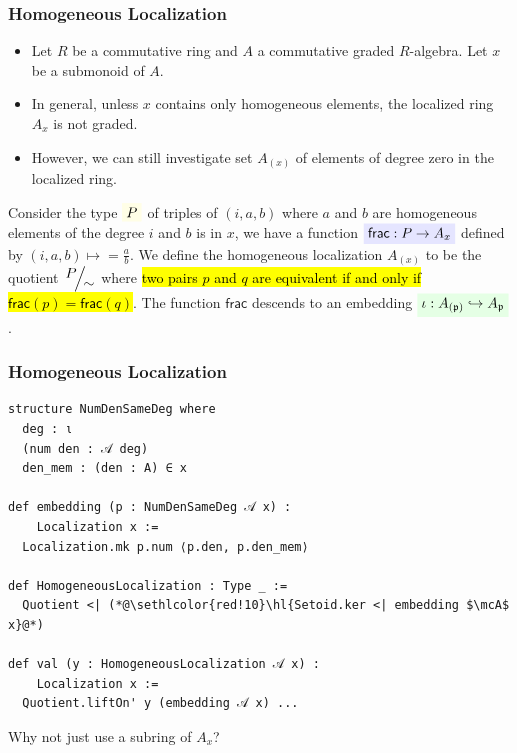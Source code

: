 \documentclass[9pt]{beamer}
\begin{document}
\begin{frame}[fragile]
  \frametitle{Homogeneous Localization}
\begin{itemize}

  \item Let $R$ be a commutative ring and $A$ a commutative graded $R$-algebra. Let $x$ be a submonoid of $A$. 
  \item In general, unless $x$ contains only homogeneous elements, the localized ring $A_x$ is not graded.
  \item However, we can still investigate set $A_{(x)}$ of elements of degree zero in the localized ring. 
\end{itemize}

Consider the type $\mathcolorbox{yellow!10}{P}$ of triples of $(i, a, b)$ where $a$ and $b$ are 
  homogeneous elements of the degree $i$ and $b$ is in $x$, we have a function $\mathcolorbox{blue!10}{\mathsf{frac} : P \to A_{x}}$ defined by
  $(i, a, b) \mapsto =\frac a b$.
  We define the homogeneous localization $A_{(x)}$ to be the quotient $\quotient{P}{\sim}$ where \hl{two pairs $p$ and $q$
  are equivalent if and only if $\mathsf{frac}(p) = \mathsf{frac}(q)$}. 
  The function $\mathsf{frac}$ descends to an embedding $\mathcolorbox{green!10}{\iota: \hloca A{\mfp} \hookrightarrow A_{\mfp}}$.
\end{frame}

\begin{frame}[fragile]
  \frametitle{Homogeneous Localization}
\begin{lstlisting}[linebackgroundcolor={%
  \ifnum\value{lstnumber}=1\color{yellow!10}\fi
  \ifnum\value{lstnumber}=2\color{yellow!10}\fi
  \ifnum\value{lstnumber}=3\color{yellow!10}\fi
  \ifnum\value{lstnumber}=4\color{yellow!10}\fi
  \ifnum\value{lstnumber}=6\color{blue!10}\fi
  \ifnum\value{lstnumber}=7\color{blue!10}\fi
  \ifnum\value{lstnumber}=8\color{blue!10}\fi
  \ifnum\value{lstnumber}=13\color{green!10}\fi
  \ifnum\value{lstnumber}=14\color{green!10}\fi
  \ifnum\value{lstnumber}=15\color{green!10}\fi},
  mathescape=true, caption={Homogeneous Localization}]
structure NumDenSameDeg where
  deg : ι
  (num den : 𝒜 deg)
  den_mem : (den : A) ∈ x

def embedding (p : NumDenSameDeg 𝒜 x) : 
    Localization x :=
  Localization.mk p.num ⟨p.den, p.den_mem⟩

def HomogeneousLocalization : Type _ :=
  Quotient <| (*@\sethlcolor{red!10}\hl{Setoid.ker <| embedding $\mcA$ x}@*)

def val (y : HomogeneousLocalization 𝒜 x) : 
    Localization x :=
  Quotient.liftOn' y (embedding 𝒜 x) ...
\end{lstlisting}

Why not just use a subring of $A_x$? 
\end{frame}
\end{document}
